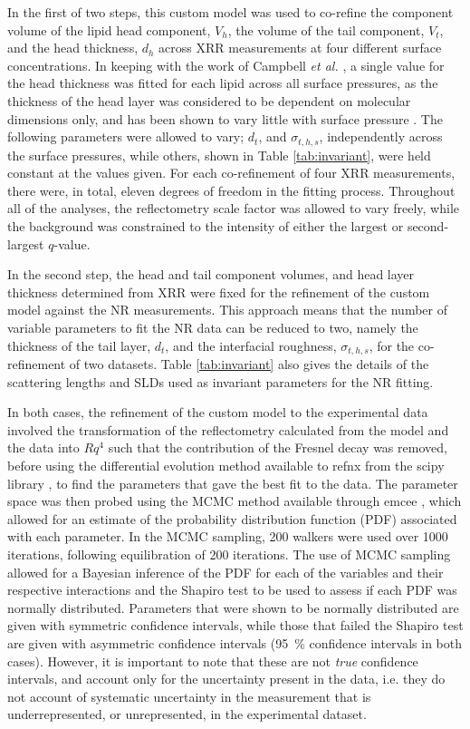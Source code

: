 \documentclass[amsmath,amssymb,twocolumn,superscriptaddress]{revtex4-1}
\begin{document}
In the first of two steps, this custom model was used to co-refine the component volume of the lipid head component, $V_h$, the volume of the tail component, $V_t$, and the head thickness, $d_h$ across XRR measurements at four different surface concentrations.
In keeping with the work of Campbell \emph{et al.} \cite{campbell_structure_2018}, a single value for the head thickness was fitted for each lipid across all surface pressures, as the thickness of the head layer was considered to be dependent on molecular dimensions only, and has been shown to vary little with surface pressure \cite{kewalramani_effects_2010}.
The following parameters were allowed to vary; $d_t$, and $\sigma_{t,h,s}$, independently across the surface pressures, while others, shown in Table \ref{tab:invariant}, were held constant at the values given.
For each co-refinement of four XRR measurements, there were, in total, eleven degrees of freedom in the fitting process.
Throughout all of the analyses, the reflectometry scale factor was allowed to vary freely, while the background was constrained to the intensity of either the largest or second-largest $q$-value.

In the second step, the head and tail component volumes, and head layer thickness determined from XRR were fixed for the refinement of the custom model against the NR measurements.
This approach means that the number of variable parameters to fit the NR data can be reduced to two, namely the thickness of the tail layer, $d_t$, and the interfacial roughness, $\sigma_{t,h,s}$, for the co-refinement of two datasets.
Table \ref{tab:invariant} also gives the details of the scattering lengths and SLDs used as invariant parameters for the NR fitting.

In both cases, the refinement of the custom model to the experimental data involved the transformation of the reflectometry calculated from the model and the data into $Rq^4$ such that the contribution of the Fresnel decay was removed, before using the differential evolution method available to refnx from the scipy library \cite{jones_scipy_2001}, to find the parameters that gave the best fit to the data.
The parameter space was then probed using the MCMC method available through emcee \cite{foreman-mackey_emcee_2013}, which allowed for an estimate of the probability distribution function (PDF) associated with each parameter.
In the MCMC sampling, 200 walkers were used over 1000 iterations, following equilibration of 200 iterations.
The use of MCMC sampling allowed for a Bayesian inference of the PDF for each of the variables and their respective interactions and the Shapiro test to be used to assess if each PDF was normally distributed.
Parameters that were shown to be normally distributed are given with symmetric confidence intervals, while those that failed the Shapiro test are given with asymmetric confidence intervals (\SI{95}{\percent} confidence intervals in both cases).
However, it is important to note that these are not \emph{true} confidence intervals, and account only for the uncertainty present in the data, i.e. they do not account of systematic uncertainty in the measurement that is underrepresented, or unrepresented, in the experimental dataset.
\end{document}
